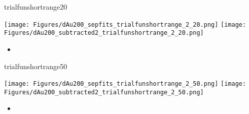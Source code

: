 \documentclass[aspectratio=169,compress,10pt]{beamer}
\begin{document}
\begin{frame}{trialfunshortrange20}
\begin{center}
\texttt{[image: Figures/dAu200\_sepfits\_trialfunshortrange\_2\_20.png]}
\texttt{[image: Figures/dAu200\_subtracted2\_trialfunshortrange\_2\_20.png]}
\end{center}
\begin{itemize}
\item %
\end{itemize}
\end{frame}



\begin{frame}{trialfunshortrange50}
\begin{center}
\texttt{[image: Figures/dAu200\_sepfits\_trialfunshortrange\_2\_50.png]}
\texttt{[image: Figures/dAu200\_subtracted2\_trialfunshortrange\_2\_50.png]}
\end{center}
\begin{itemize}
\item %
\end{itemize}
\end{frame}
\end{document}
